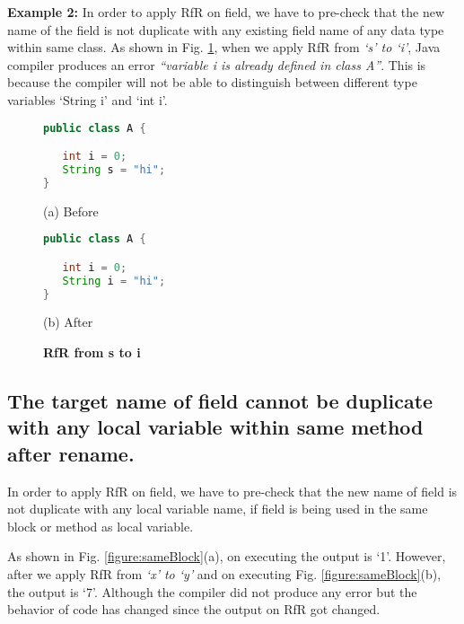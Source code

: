 \textbf{Example 2:} In order to apply RfR on field, we have to pre-check that the new name of the field is not duplicate with any existing field name of any data type within same class. As shown in Fig. \ref{figure:diffType}, when we apply RfR from \emph{`s' to `i'}, Java compiler produces an error \textit{``variable i is already defined in class A''}. This is because the compiler will not be able to distinguish between different type variables `String i' and `int i'. 

\begin{figure}[th]
\centering
\begin{minipage}[t]{0.48\linewidth}
\begin{lstlisting}[language=java, basicstyle=\scriptsize\ttfamily,frame=single]
public class A {

   int i = 0;
   String s = "hi";
}

\end{lstlisting}
\centering(a) Before
\end{minipage}
\hfill
\begin{minipage}[t]{0.48\linewidth}
\begin{lstlisting}[language=java, basicstyle=\scriptsize\ttfamily,frame=single]
public class A {

   int i = 0;
   String i = "hi";
}
\end{lstlisting}
\centering(b) After
\end{minipage}
\caption{\textbf{RfR from s to i}}
\label{figure:diffType}
\end{figure}

\subsection{The target name of field cannot be duplicate with any local variable within same method after rename.}
In order to apply RfR on field, we have to pre-check that the new name of field is not duplicate with any local variable name, if field is being used in the same block or method as local variable. 

As shown in Fig. \ref{figure:sameBlock}(a), on executing the output is `1'. However,  after we apply RfR from \emph{`x' to `y'} and on executing Fig. \ref{figure:sameBlock}(b), the output is `7'. Although the compiler did not produce any error but the behavior of code has changed since the output on RfR got changed. 

